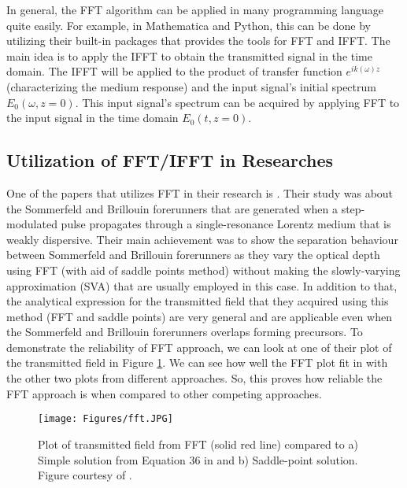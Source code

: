 In general, the FFT algorithm can be applied in many programming language quite easily. For example, in Mathematica and Python, this can be done by utilizing their built-in packages that provides the tools for FFT and IFFT. The main idea is to apply the IFFT to obtain the transmitted signal in the time domain. The IFFT will be applied to the product of transfer function $e^{i k(\omega)z}$ (characterizing the medium response) and the input signal's initial spectrum $E_{0}(\omega, z = 0)$. This input signal's spectrum can be acquired by applying FFT to the input signal in the time domain $E_{0}(t, z = 0)$.

\subsection{Utilization of FFT/IFFT in Researches}
One of the papers that utilizes FFT in their research is . Their study was about the Sommerfeld and Brillouin forerunners that are generated when a step-modulated pulse propagates through a single-resonance Lorentz medium that is weakly dispersive. Their main achievement was to show the separation behaviour between Sommerfeld and Brillouin forerunners as they vary the optical depth using FFT (with aid of saddle points method) without making the slowly-varying approximation (SVA) that are usually employed in this case. In addition to that, the analytical expression for the transmitted field that they acquired using this method (FFT and saddle points) are very general and are applicable even when the Sommerfeld and Brillouin forerunners overlaps forming precursors. To demonstrate the reliability of FFT approach, we can look at one of their plot of the transmitted field in Figure \ref{fig: fft}. We can see how well the FFT plot fit in with the other two plots from different approaches. So, this proves how reliable the FFT approach is when compared to other competing approaches.

\begin{figure}
    \centering
    \texttt{[image: Figures/fft.JPG]}
    \caption[Plot of Transmitted Field Using FFT, Simple and Saddle-Point Solution]{Plot of transmitted field from FFT (solid red line) compared to a) Simple solution from Equation 36 in \protect\cite{Macke2013} and b) Saddle-point solution. Figure courtesy of \protect\cite{Macke2013}.}
    \label{fig: fft}
\end{figure}

